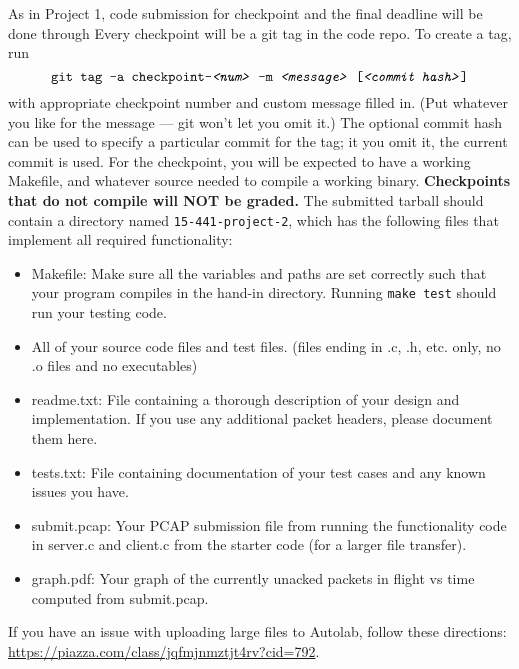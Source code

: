 
As in Project 1, code submission for checkpoint and the final deadline will be done 
through 
Every checkpoint will be a git tag in the code repo. To create a tag, run
\[
\texttt{git tag -a checkpoint-\textit{<num>} -m \textit{<message>} [\textit{<commit hash>}]}
\]
with appropriate checkpoint number and custom message filled in. (Put whatever
you like for the message --- git won't let you omit it.) The optional commit
hash can be used to specify a particular commit for the tag; it you omit it,
the current commit is used. 
\noindent For the checkpoint, you will be expected to have a working Makefile, and 
whatever source needed to compile a working binary.  \textbf{Checkpoints that do not compile will
NOT be graded.}  
The submitted tarball should contain a directory named \texttt{15-441-project-2}, which has 
the following files that implement all required functionality:
\begin{itemize}
\item Makefile:  Make sure all the variables and paths are set correctly such 
that your program compiles in the hand-in directory. Running \texttt{make test} should run your testing code.
\item All of your source code files and test files. (files ending in .c, .h, etc. only, no .o files and no executables)
\item readme.txt: File containing a thorough description of your design and implementation. If you use any additional packet headers, please document them 
here. 
\item tests.txt: File containing documentation of your test cases and any known issues you have.

\item submit.pcap: Your PCAP submission file from running the functionality code in server.c and client.c from the starter code (for a larger file transfer). 

\item graph.pdf: Your graph of the currently unacked packets in flight vs time computed from submit.pcap. 
\end{itemize}

If you have an issue with uploading large files to Autolab, follow these directions: \url{https://piazza.com/class/jqfmjnmztjt4rv?cid=792}.


